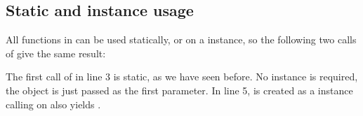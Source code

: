 \documentclass[a4paper,10pt,english]{sphinxmanual}
\begin{document}
\subsection{Static and instance usage}
\label{\detokenize{README:static-and-instance-usage}}
\sphinxAtStartPar
All functions in  can be used statically, or on a \sphinxhyphen{}instance, so the following two calls of {\hyperref[\detokenize{README:the-path-parameter}]{\emph{}}} give the same result:

\begin{sphinxVerbatim}[commandchars=\\\{\},numbers=left,firstnumber=1,stepnumber=1]
  \PYG{p}{[}  \PYG{p}{[}   \PYG{p}{]} \PYG{p}{[}  \PYG{p}{]}\PYG{p}{]}
 
  
\end{sphinxVerbatim}

\sphinxAtStartPar
The first call of {\hyperref[\detokenize{README:the-path-parameter}]{\emph{}}} in line 3 is static, as we have seen before. No  instance is required, the object  is just passed as the first parameter. In line 5,  is created as a \sphinxhyphen{}instance \textendash{} calling {\hyperref[\detokenize{README:the-path-parameter}]{\emph{}}} on  also yields .
\end{document}
